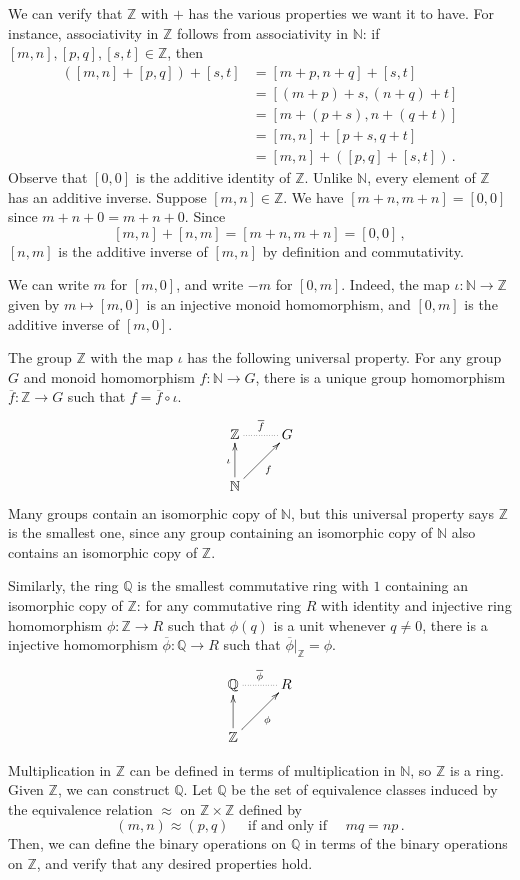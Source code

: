 \documentclass[12pt,a4paper]{article}
\begin{document}
We can verify that $\mathbb{Z}$ with $+$ has the various properties we want it to have. For instance, associativity in $\mathbb{Z}$ follows from associativity in $\mathbb{N}$: if $[m,n],[p,q],[s,t]\in\mathbb{Z}$, then
\begin{align*}
	([m,n] + [p,q]) + [s,t] &= [m+p, n+q] + [s,t] \\
	&= [(m+p)+s, (n+q)+t] \\
	&= [m+(p+s), n+(q+t)] \\
	&= [m,n] + [p+s, q+t] \\
	&= [m,n] + ([p,q] + [s,t])\,.
\end{align*}
 Observe that $[0,0]$ is the additive identity of $\mathbb{Z}$. Unlike $\mathbb{N}$, every element of $\mathbb{Z}$ has an additive inverse. Suppose $[m,n]\in\mathbb{Z}$. We have $[m+n,m+n] = [0,0]$ since $m+n+0 = m+n+0$. Since
\[
	[m,n] + [n,m] = [m+n,m+n] = [0,0]\,,
\]
$[n,m]$ is the additive inverse of $[m,n]$ by definition and commutativity.

We can write $m$ for $[m,0]$, and write $-m$ for $[0,m]$. Indeed, the map $\iota: \mathbb{N}\rightarrow\mathbb{Z}$ given by $m\mapsto [m,0]$ is an injective monoid homomorphism, and $[0,m]$ is the additive inverse of $[m,0]$.

The group $\mathbb{Z}$ with the map $\iota$ has the following universal property. For any group $G$ and monoid homomorphism $f: \mathbb{N}\rightarrow G$, there is a unique group homomorphism $\overline{f}: \mathbb{Z}\rightarrow G$ such that $f = \overline{f}\circ \iota$.
\[\xymatrix{
	\mathbb{Z} \ar@{.}[r]^{\overline{f}} & G \\
	\mathbb{N} \ar[u]^\iota \ar[ur]_f
}\]
Many groups contain an isomorphic copy of $\mathbb{N}$, but this universal property says $\mathbb{Z}$ is the smallest one, since any group containing an isomorphic copy of $\mathbb{N}$ also contains an isomorphic copy of $\mathbb{Z}$.

Similarly, the ring $\mathbb{Q}$ is the smallest commutative ring with $1$ containing an isomorphic copy of $\mathbb{Z}$: for any commutative ring $R$ with identity and injective ring homomorphism $\phi: \mathbb{Z}\rightarrow R$ such that $\phi(q)$ is a unit whenever $q\neq 0$, there is a injective homomorphism $\overline{\phi}: \mathbb{Q}\rightarrow R$ such that $\overline{\phi}\vert_{\mathbb{Z}} = \phi$.
\[\xymatrix{
	\mathbb{Q} \ar@{.}[r]^{\overline{\phi}} & R \\
	\mathbb{Z} \ar[u] \ar[ur]_{\phi}
}\]

Multiplication in $\mathbb{Z}$ can be defined in terms of multiplication in $\mathbb{N}$, so $\mathbb{Z}$ is a ring. Given $\mathbb{Z}$, we can construct $\mathbb{Q}$. Let $\mathbb{Q}$ be the set of equivalence classes induced by the equivalence relation $\approx$ on $\mathbb{Z}\times\mathbb{Z}$ defined by
\[
	(m,n) \approx (p,q) \quad\text{ if and only if }\quad mq = np\,.
\]
Then, we can define the binary operations on $\mathbb{Q}$ in terms of the binary operations on $\mathbb{Z}$, and verify that any desired properties hold.
\end{document}
